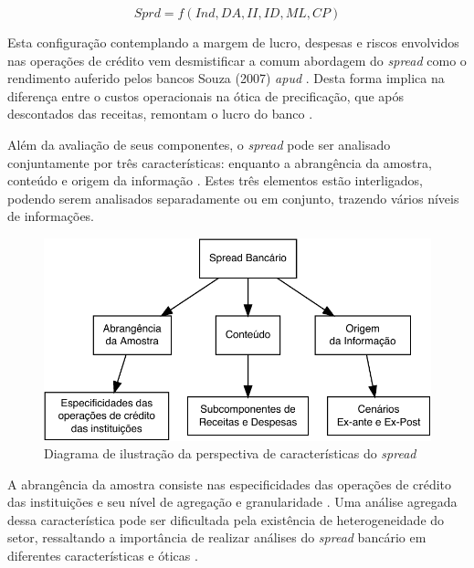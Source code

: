 \documentclass[
  12pt,
  12pt,
  openright,
  oneside,
  a4paper,
  chapter=TITLE,
  section=TITLE,
  subsection=TITLE,
  subsubsection=TITLE,
  english,
  portugues,
  sumario=tradicional]{abntex2}
\begin{document}
\begin{equation}
Sprd=f(Ind, DA, II, ID, ML, CP)
\end{equation}

Esta configuração contemplando a margem de lucro, despesas e riscos envolvidos nas operações de crédito vem desmistificar a comum abordagem do \emph{spread} como o rendimento auferido pelos bancos \cite{costa;nakane:2004} Souza (2007) \emph{apud} \cite{dantas:2012}. Desta forma implica na diferença entre o custos operacionais na ótica de precificação, que após descontados das receitas, remontam o lucro do banco \cite{BCB:2016}.

Além da avaliação de seus componentes, o \emph{spread} pode ser analisado
conjuntamente por três características: enquanto a abrangência da amostra,
conteúdo e origem da informação \cite{leal:2006}. Estes três elementos estão interligados, podendo serem analisados separadamente ou em conjunto, trazendo vários níveis de informações.

\begin{figure}[!htbp]
\vspace{20pt}
\caption{Diagrama de ilustração da perspectiva de características do \emph{spread}}
\vspace{-4mm}

\begin{center}\includegraphics{12-exportedfigures/diagram.spread.carac-1} \end{center}
\vspace{-3mm}
\label{fig:diagramb}
\vspace{-2mm}
\end{figure}

A abrangência da amostra consiste nas especificidades das operações de crédito das instituições e seu nível de agregação e granularidade \cite{costa;nakane:2004}. Uma análise agregada dessa característica pode ser dificultada pela existência de heterogeneidade do setor, ressaltando a importância de realizar análises do \emph{spread} bancário em diferentes características e óticas \cite{block:2000}.
\end{document}
